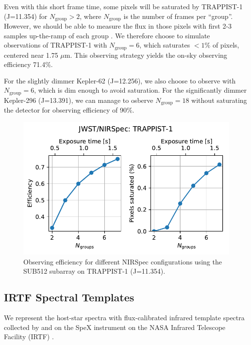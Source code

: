 Even with this short frame time, some pixels will be saturated by TRAPPIST-1 (J=11.354) for $N_\mathrm{group} > 2$, where $N_\mathrm{group}$ is the number of frames per ``group''. However, we should be able to measure the flux in those pixels with first 2-3 samples up-the-ramp of each group \citep[see also][]{Batalha2018}. We therefore choose to simulate observations of TRAPPIST-1 with $N_\mathrm{group} = 6$, which saturates $<1\%$ of pixels, centered near 1.75 $\mu$m. This observing strategy yields the on-sky observing efficiency 71.4\%. 

For the slightly dimmer Kepler-62 (J=12.256), we also choose to observe with $N_\mathrm{group} = 6$, which is dim enough to avoid saturation. For the significantly dimmer Kepler-296 (J=13.391), we can manage to osberve $N_\mathrm{group} = 18$ without saturating the detector for observing efficiency of 90\%.

\begin{figure}
    \centering
    \includegraphics[scale=0.65]{libra/efficiency.pdf}
    \caption{Observing efficiency for different NIRSpec configurations using the SUB512 subarray on TRAPPIST-1 (J=11.354).}
    \label{fig:efficiency}
\end{figure}

\subsection{IRTF Spectral Templates}

We represent the host-star spectra with flux-calibrated infrared template spectra collected by \citet{Cushing2005} and \citet{Rayner2009} on the SpeX instrument on the NASA Infrared Telescope Facility (IRTF) \citep{Rayner2003}. 

